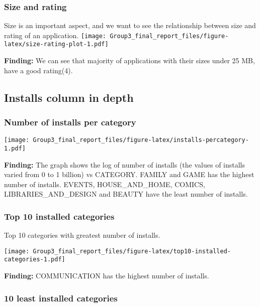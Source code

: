 \documentclass[
]{article}
\begin{document}
\hypertarget{size-and-rating}{%
\subsubsection{Size and rating}\label{size-and-rating}}

Size is an important aspect, and we want to see the relationship between
size and rating of an application.
\texttt{[image: Group3\_final\_report\_files/figure-latex/size-rating-plot-1.pdf]}

\textbf{Finding:} We can see that majority of applications with their
sizes under 25 MB, have a good rating(4).

\hypertarget{installs-column-in-depth}{%
\subsection{Installs column in depth}\label{installs-column-in-depth}}

\hypertarget{number-of-installs-per-category}{%
\subsubsection{Number of installs per
category}\label{number-of-installs-per-category}}

\texttt{[image: Group3\_final\_report\_files/figure-latex/installs-percategory-1.pdf]}

\textbf{Finding:} The graph shows the log of number of installs (the
values of installs varied from 0 to 1 billion) vs CATEGORY. FAMILY and
GAME has the highest number of installs. EVENTS, HOUSE\_AND\_HOME,
COMICS, LIBRARIES\_AND\_DESIGN and BEAUTY have the least number of
installs.

\hypertarget{top-10-installed-categories}{%
\subsubsection{Top 10 installed
categories}\label{top-10-installed-categories}}

Top 10 categories with greatest number of installs.

\texttt{[image: Group3\_final\_report\_files/figure-latex/top10-installed-categories-1.pdf]}

\textbf{Finding:} COMMUNICATION has the highest number of installs.

\hypertarget{least-installed-categories}{%
\subsubsection{10 least installed
categories}\label{least-installed-categories}}
\end{document}
